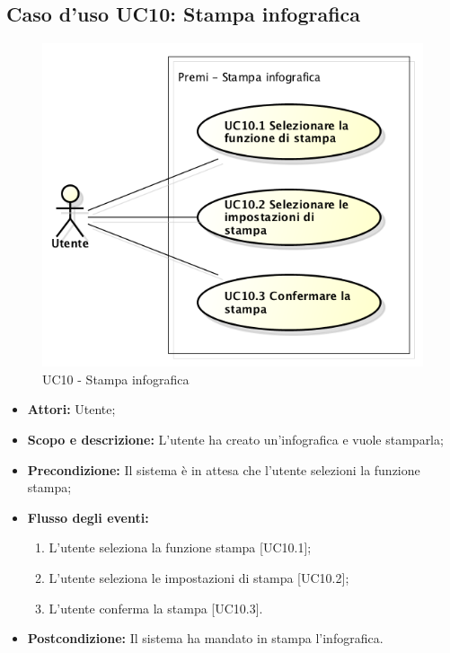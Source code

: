 \subsection{Caso d'uso UC10: Stampa infografica}
\begin{figure}[h] 
	\centering 
	\includegraphics[scale=0.45] {img/UC10.png} 
	\caption{UC10 - Stampa infografica} 
\end{figure}

\begin{itemize}
	\item \textbf{Attori:} Utente;
	\item \textbf{Scopo e descrizione:} L'utente ha creato un'infografica e vuole stamparla;
	\item \textbf{Precondizione:} Il sistema è in attesa che l'utente selezioni la funzione stampa;
	\item \textbf{Flusso degli eventi:}
	\begin{enumerate}
		\item L'utente seleziona la funzione stampa [UC10.1];
		\item L'utente seleziona le impostazioni di stampa [UC10.2];
		\item L'utente conferma la stampa [UC10.3].
	\end{enumerate}
	\item \textbf{Postcondizione:} Il sistema ha mandato in stampa l'infografica.
\end{itemize}

